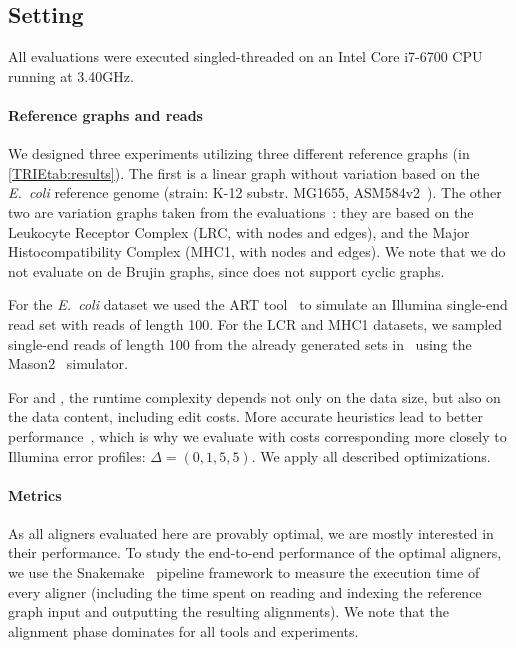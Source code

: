 \subsection{Setting}
All evaluations were executed singled-threaded on an Intel Core i7-6700 CPU running
at 3.40GHz.

\paragraph{Reference graphs and reads}
We designed three experiments utilizing three different reference graphs (in
\cref{TRIEtab:results}). The first is a linear graph without variation based on the
\textit{E.~coli} reference genome (strain: K-12 substr. MG1655,
ASM584v2~\cite{howe2019ensembl}). The other two are variation graphs taken from
the \pasgal evaluations~\cite{jain_accelerating_2019}: they are based on the
Leukocyte Receptor Complex (LRC, with  nodes and
 edges), and the Major Histocompatibility Complex (MHC1, with
 nodes and  edges).
%
We note that we do not evaluate on de Brujin graphs, since \pasgal does not
support cyclic graphs.

For the \textit{E.~coli} dataset we used the ART tool~\cite{huang_art_2012} to simulate an
Illumina single-end read set with  reads of length 100. For the LCR and
MHC1 datasets, we sampled  single-end reads of length 100 from the already
generated sets in~\cite{jain_accelerating_2019} using the
Mason2~\cite{holtgrewe_mason_2010} simulator.

For \dijkstra and \astarix, the runtime complexity depends not only on the data
size, but also on the data content, including edit costs. More accurate
heuristics lead to better \A performance~\cite{pearl_discovery_1983}, which is
why we evaluate \astarix with costs corresponding more closely to Illumina error
profiles: $\Delta=(0,1,5,5)$. We apply all described optimizations.

\paragraph{Metrics}
As all aligners evaluated here are provably optimal, we are mostly interested in
their performance.
%
To study the end-to-end performance of the optimal aligners, we use the
Snakemake~\cite{koster_snakemakescalable_2012} pipeline framework to measure the
execution time of every aligner (including the time spent on reading and
indexing the reference graph input and outputting the resulting alignments). We
note that the alignment phase dominates for all tools and experiments.

